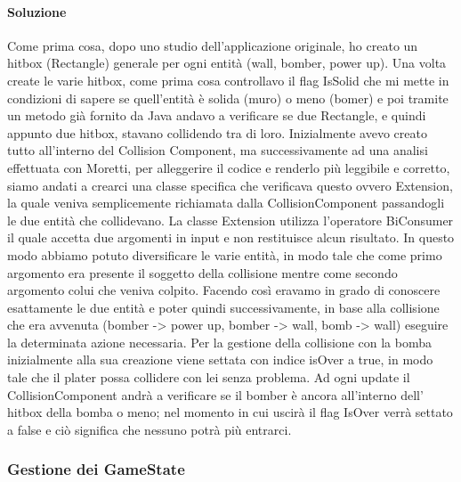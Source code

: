 \documentclass[a4paper,12pt]{report}
\begin{document}
\paragraph{Soluzione} Come prima cosa, dopo uno studio dell’applicazione originale, ho creato un hitbox (Rectangle) generale per ogni entità (wall, bomber, power up). Una volta create le varie hitbox, come prima cosa controllavo il flag IsSolid che mi mette in condizioni di sapere se quell’entità è solida (muro) o meno (bomer) e poi tramite un metodo già fornito da Java andavo a verificare se due Rectangle, e quindi appunto due hitbox, stavano collidendo tra di loro. Inizialmente avevo creato tutto all’interno del Collision Component, ma successivamente ad una analisi effettuata con Moretti, per alleggerire il codice e renderlo più leggibile e corretto, siamo andati a crearci una classe specifica che verificava questo ovvero Extension, la quale veniva semplicemente richiamata dalla CollisionComponent passandogli le due entità che collidevano. La classe Extension utilizza l’operatore BiConsumer il quale accetta due argomenti in input e non restituisce alcun risultato. In questo modo abbiamo potuto diversificare le varie entità, in modo tale che come primo argomento era presente il soggetto della collisione mentre come secondo argomento colui che veniva colpito. Facendo così eravamo in grado di conoscere esattamente le due entità e poter quindi successivamente, in base alla collisione che era avvenuta (bomber -> power up, bomber -> wall, bomb -> wall) eseguire la determinata azione necessaria.
Per la gestione della collisione con la bomba inizialmente alla sua creazione viene settata con indice isOver a true, in modo tale che il plater possa collidere con lei senza problema. Ad ogni update il CollisionComponent andrà a verificare se il bomber è ancora all’interno dell’ hitbox della bomba o meno; nel momento in cui uscirà il flag IsOver verrà settato a false e ciò significa che nessuno potrà più entrarci.


\subsubsection{Gestione dei GameState}
\end{document}
